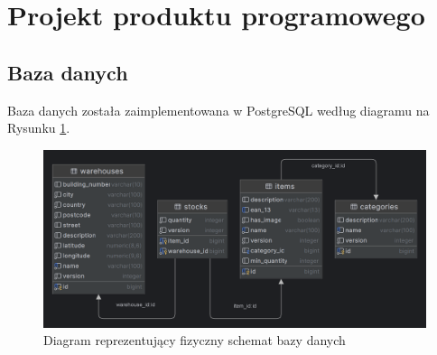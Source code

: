 \documentclass[../main.tex]{subfiles}
\begin{document}
\section{Projekt produktu programowego}
    \subsection{Baza danych}
        Baza danych została zaimplementowana w PostgreSQL według diagramu na Rysunku \ref{fig:db-diagram}.

        \begin{figure}[H]
            \centering
            \includegraphics[width=1.0\linewidth]{images/db-diagram.png}
            \caption{Diagram reprezentujący fizyczny schemat bazy danych}
            \label{fig:db-diagram}
        \end{figure}
\end{document}
